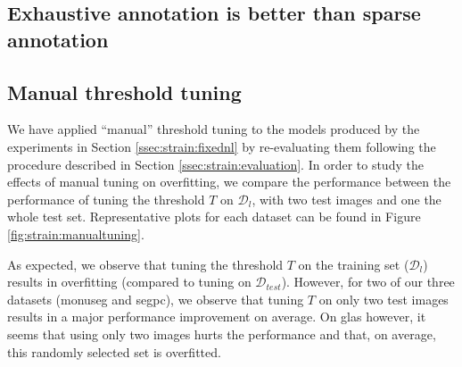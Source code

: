 \subsection{Exhaustive annotation is better than sparse annotation }
\label{ssec:strain:sparsevsexhaustive}


\subsection{Manual threshold tuning}

We have applied ``manual'' threshold tuning to the models produced by the experiments in Section \ref{ssec:strain:fixednl} by re-evaluating them following the procedure described in Section \ref{ssec:strain:evaluation}. In order to study the effects of manual tuning on overfitting, we compare the performance between the performance of tuning the threshold $T$ on $\mathcal{D}_l$, with two test images and one the whole test set. Representative plots for each dataset can be found in Figure \ref{fig:strain:manualtuning}.

As expected, we observe that tuning the threshold $T$ on the training set ($\mathcal{D}_l$) results in overfitting (\ie compared to tuning on $\mathcal{D}_{test}$). However, for two of our three datasets (\acrshort{monuseg} and \acrshort{segpc}), we observe that tuning $T$ on only two test images results in a major performance improvement on average. On \acrshort{glas} however, it seems that using only two images hurts the performance and that, on average, this randomly selected set is overfitted. 

